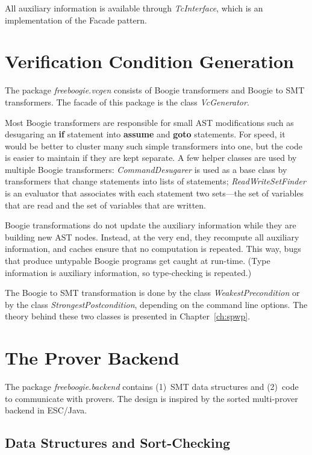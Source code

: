 \documentclass{llncs}
\newcommand{\escjava}{ESC\slash Java\xspace}
\begin{document}
All auxiliary information is available through
\textit{TcInterface}, which is an implementation of the Facade
pattern.

\section{Verification Condition Generation} %

The package \textit{freeboogie.vcgen} consists of Boogie
transformers and Boogie to SMT transformers. The facade of this
package is the class \textit{VcGenerator}.

Most Boogie transformers are responsible for small AST
modifications such as desugaring an \textbf{if} statement
into \textbf{assume} and \textbf{goto} statements. For speed,
it would be better to cluster many such simple transformers
into one, but the code is easier to maintain if they are kept
separate. A few helper classes are used by multiple Boogie
transformers: \textit{CommandDesugarer} is used as a base class
by transformers that change statements into lists of statements;
\textit{ReadWriteSetFinder} is an evaluator that associates with
each statement two sets---the set of variables that are read and
the set of variables that are written.

Boogie transformations do not update the auxiliary information
while they are building new AST nodes. Instead, at the very end,
they recompute all auxiliary information, and caches ensure that
no computation is repeated. This way, bugs that produce untypable
Boogie programs get caught at run-time. (Type information is
auxiliary information, so type-checking is repeated.)

The Boogie to SMT transformation is done by the
class \textit{WeakestPrecondition} or by the class
\textit{StrongestPostcondition}, depending on the command line
options. The theory behind these two classes is presented in
Chapter~\ref{ch:spwp}.

\section{The Prover Backend} %
\label{sec:design.backend}

The package \textit{freeboogie.backend} contains (1)~SMT data
structures and (2)~code to communicate with provers. The design
is inspired by the sorted multi-prover backend in \escjava.

\subsection{Data Structures and Sort-Checking} %
\label{sec:design.ds}
\end{document}
